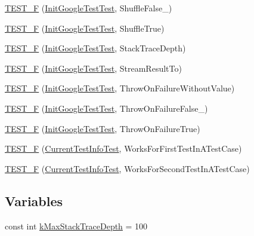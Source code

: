 \begin{DoxyCompactItemize}
\hyperlink{namespacetesting_a1acc3dcde65e75293451073528cb1c5a}{T\+E\+S\+T\+\_\+\+F} (\hyperlink{classtesting_1_1_init_google_test_test}{Init\+Google\+Test\+Test}, Shuffle\+False\+\_)
\item 
\hyperlink{namespacetesting_a24bb2b3783b9e0c419db7f974b641cd4}{T\+E\+S\+T\+\_\+\+F} (\hyperlink{classtesting_1_1_init_google_test_test}{Init\+Google\+Test\+Test}, Shuffle\+True)
\item 
\hyperlink{namespacetesting_af8579f8ad3383827814d1fbea4fdeee9}{T\+E\+S\+T\+\_\+\+F} (\hyperlink{classtesting_1_1_init_google_test_test}{Init\+Google\+Test\+Test}, Stack\+Trace\+Depth)
\item 
\hyperlink{namespacetesting_ad9cf0c452b4d2645b037725957021c6c}{T\+E\+S\+T\+\_\+\+F} (\hyperlink{classtesting_1_1_init_google_test_test}{Init\+Google\+Test\+Test}, Stream\+Result\+To)
\item 
\hyperlink{namespacetesting_a2824800277b4a1e8732abd5d7c2349d1}{T\+E\+S\+T\+\_\+\+F} (\hyperlink{classtesting_1_1_init_google_test_test}{Init\+Google\+Test\+Test}, Throw\+On\+Failure\+Without\+Value)
\item 
\hyperlink{namespacetesting_adfcdbd6b2715fddd03a47a822517ddea}{T\+E\+S\+T\+\_\+\+F} (\hyperlink{classtesting_1_1_init_google_test_test}{Init\+Google\+Test\+Test}, Throw\+On\+Failure\+False\+\_)
\item 
\hyperlink{namespacetesting_ad7513c23ff21a4d2761cadfd2afe87e1}{T\+E\+S\+T\+\_\+\+F} (\hyperlink{classtesting_1_1_init_google_test_test}{Init\+Google\+Test\+Test}, Throw\+On\+Failure\+True)
\item 
\hyperlink{namespacetesting_a1e55a3ca18d877e1e83ce0ed9e7b5c79}{T\+E\+S\+T\+\_\+\+F} (\hyperlink{classtesting_1_1_current_test_info_test}{Current\+Test\+Info\+Test}, Works\+For\+First\+Test\+In\+A\+Test\+Case)
\item 
\hyperlink{namespacetesting_a3775bdbb5d24619425c52103e7ae6434}{T\+E\+S\+T\+\_\+\+F} (\hyperlink{classtesting_1_1_current_test_info_test}{Current\+Test\+Info\+Test}, Works\+For\+Second\+Test\+In\+A\+Test\+Case)
\end{DoxyCompactItemize}
\subsection*{Variables}
\begin{DoxyCompactItemize}
\item 
const int \hyperlink{namespacetesting_ae605f2ccac04616bb7812ca72e517082}{k\+Max\+Stack\+Trace\+Depth} = 100
\end{DoxyCompactItemize}


